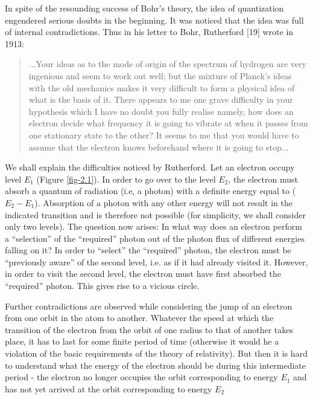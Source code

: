 \documentclass[a4paper,sfsidenotes,colorlinks=true]{tufte-book}
\numberwithin{equation}{section}
\numberwithin{figure}{section}
\begin{document}
In spite of the
resounding success of Bohr's theory, the idea of quantization
engendered serious doubts in the beginning. It was noticed that the
idea was full of internal contradictions. Thus in his letter to
Bohr, Rutherford [19] wrote in 1913: 
\begin{quote}
  ...Your ideas as to the mode of origin of the spectrum of hydrogen
  are very ingenious and seem to work out well; but the mixture of
  Planck's ideas with the old mechanics makes it very difficult to
  form a physical idea of what is the basis of it. There appears to me
  one grave difficulty in your hypothesis which I have no doubt you
  fully realise namely, how does an electron decide what frequency it
  is going to vibrate at when it passes from one stationary state to
  the other? It seems to me that you would have to assume that the
  electron knows beforehand where it is going to stop...
\end{quote}

We shall explain the difficulties noticed by Rutherford. Let an
electron occupy level $E_{1}$ (Figure \ref{fig-2.1}). In order to go
over to the level $E_{2}$, the electron must absorb a quantum of
radiation (i.e, a photon) with a definite energy equal to ($E_{2} - E_{1}$). Absorption of a photon with any other energy will not result
in the indicated transition and is therefore not possible (for
simplicity, we shall consider only two levels). The question now
arises: In what way does an electron perform a ``selection'' of the
``required'' photon out of the photon flux of different energies falling
on it? In order to ``select'' the ``required'' photon, the electron must
be ``previously aware'' of the second level, i.e. as if it had already
visited it. However, in order to visit the second level, the electron
must have first absorbed the ``required'' photon. This gives rise to a
vicious circle.  


\begin{fullwidth}
  \setlength{\leftskip}{3cm} \textsf{\small Further contradictions are
    observed while considering the jump of an electron from one orbit
    in the atom to another. Whatever the speed at which the transition
    of the electron from the orbit of one radius to that of another
    takes place, it has to last for some finite period of time
    (otherwise it would he a violation of the basic requirements of
    the theory of relativity). But then it is hard to understand what
    the energy of the electron should be during this intermediate
    period - the electron no longer occupies the orbit corresponding to
    energy $E_{1}$ and has not yet arrived at the orbit corresponding to
    energy $E_{2}$}
\end{fullwidth}
\vspace{5pt}
\setlength{\leftskip}{0pt}
\end{document}
